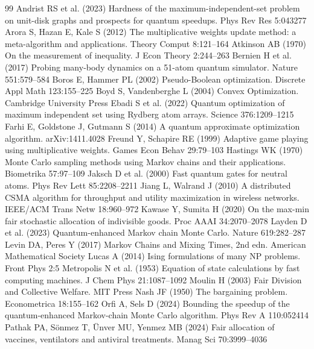 \documentclass[11pt,a4paper]{article}
\begin{document}
\begin{thebibliography}{99}\small
{} Andrist RS et al. (2023) Hardness of the maximum-independent-set problem on unit-disk graphs and prospects for quantum speedups. Phys Rev Res 5:043277
 Arora S, Hazan E, Kale S (2012) The multiplicative weights update method: a meta-algorithm and applications. Theory Comput 8:121--164
 Atkinson AB (1970) On the measurement of inequality. J Econ Theory 2:244--263
 Bernien H et al. (2017) Probing many-body dynamics on a 51-atom quantum simulator. Nature 551:579--584
 Boros E, Hammer PL (2002) Pseudo-Boolean optimization. Discrete Appl Math 123:155--225
 Boyd S, Vandenberghe L (2004) Convex Optimization. Cambridge University Press
 Ebadi S et al. (2022) Quantum optimization of maximum independent set using Rydberg atom arrays. Science 376:1209--1215
 Farhi E, Goldstone J, Gutmann S (2014) A quantum approximate optimization algorithm. arXiv:1411.4028
 Freund Y, Schapire RE (1999) Adaptive game playing using multiplicative weights. Games Econ Behav 29:79--103
 Hastings WK (1970) Monte Carlo sampling methods using Markov chains and their applications. Biometrika 57:97--109
 Jaksch D et al. (2000) Fast quantum gates for neutral atoms. Phys Rev Lett 85:2208--2211
 Jiang L, Walrand J (2010) A distributed CSMA algorithm for throughput and utility maximization in wireless networks. IEEE/ACM Trans Netw 18:960--972
 Kawase Y, Sumita H (2020) On the max-min fair stochastic allocation of indivisible goods. Proc AAAI 34:2070--2078
 Layden D et al. (2023) Quantum-enhanced Markov chain Monte Carlo. Nature 619:282--287
 Levin DA, Peres Y (2017) Markov Chains and Mixing Times, 2nd edn. American Mathematical Society
 Lucas A (2014) Ising formulations of many NP problems. Front Phys 2:5
 Metropolis N et al. (1953) Equation of state calculations by fast computing machines. J Chem Phys 21:1087--1092
 Moulin H (2003) Fair Division and Collective Welfare. MIT Press
 Nash JF (1950) The bargaining problem. Econometrica 18:155--162
 Orfi A, Sels D (2024) Bounding the speedup of the quantum-enhanced Markov-chain Monte Carlo algorithm. Phys Rev A 110:052414
 Pathak PA, S\"onmez T, \"Unver MU, Yenmez MB (2024) Fair allocation of vaccines, ventilators and antiviral treatments. Manag Sci 70:3999--4036

\end{thebibliography}
\end{document}
